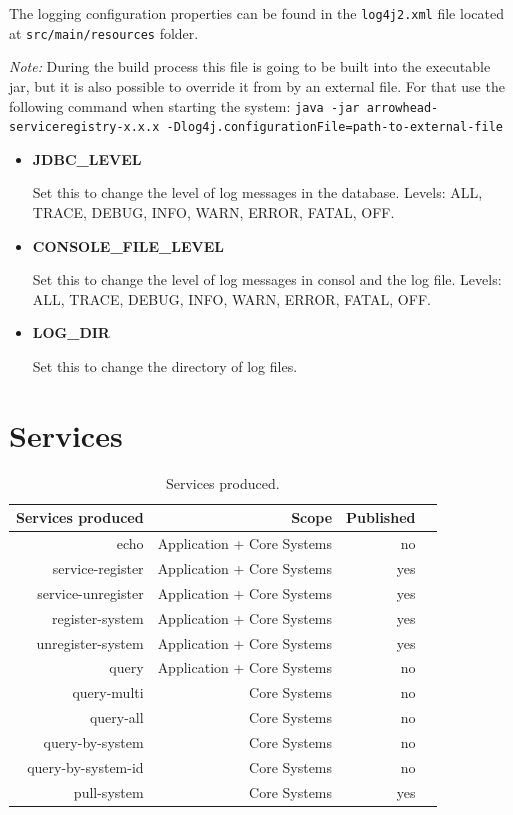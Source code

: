 \documentclass[a4paper]{arrowhead}
\begin{document}
The logging configuration properties can be found in the \texttt{log4j2.xml} file located at \texttt{src/main/resources} folder.

\textit{Note:} During the build process this file is going to be built into the executable jar, but it is also possible to override it from by an external file. For that use the following command when starting the system: \texttt{java -jar arrowhead-serviceregistry-x.x.x -Dlog4j.configurationFile={path-to-external-file}}

\begin{itemize}
    \item \textbf{JDBC\_LEVEL}
    
    Set this to change the level of log messages in the database. Levels: ALL, TRACE, DEBUG, INFO, WARN, ERROR, FATAL, OFF.
    
    \item \textbf{CONSOLE\_FILE\_LEVEL}
    
    Set this to change the level of log messages in consol and the log file. Levels: ALL, TRACE, DEBUG, INFO, WARN, ERROR, FATAL, OFF.
    
    \item \textbf{LOG\_DIR}
    
    Set this to change the directory of log files.
\end{itemize}
  
\newpage

\section{Services}
\label{sec:services}

\begin{table}[ht!]
  \centering
  \caption{Services produced. }
  \label{tab:services}
  \begin{tabular}{|r|r|r|r|}
    \hline
    \rowcolor{gray!33}\textbf{Services produced} & \textbf{Scope} & \textbf{Published} \\
    \hline
 
    echo & Application + Core Systems & no  \\ \hline
    service-register & Application + Core Systems & yes \\ \hline
    service-unregister & Application + Core Systems & yes \\ \hline
    register-system & Application + Core Systems & yes \\ \hline
    unregister-system & Application + Core Systems & yes \\ \hline
    query & Application + Core Systems & no \\ \hline
    query-multi & Core Systems & no \\ \hline
    query-all & Core Systems & no \\ \hline
    query-by-system & Core Systems & no \\ \hline
    query-by-system-id & Core Systems & no \\ \hline
    pull-system & Core Systems & yes \\ \hline
  \end{tabular}
\end{table}
\end{document}
